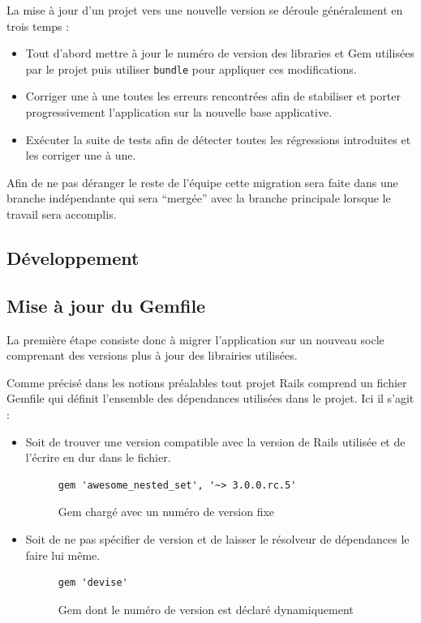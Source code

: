 \documentclass[12pt,a4paper]{book}
\begin{document}
La mise à jour d'un projet vers une nouvelle version se déroule généralement en trois temps :
\begin{itemize}
  \item Tout d'abord mettre à jour le numéro de version des libraries et Gem utilisées par le projet puis utiliser \texttt{bundle} pour appliquer ces modifications.
  \item Corriger une à une toutes les erreurs rencontrées afin de stabiliser et porter progressivement l'application sur la nouvelle base applicative.
  \item Exécuter la suite de tests afin de détecter toutes les régressions introduites et les corriger une à une.
\end{itemize}

Afin de ne pas déranger le reste de l'équipe cette migration sera faite dans une branche indépendante qui sera ``mergée'' avec la branche principale lorsque le travail sera accomplis.

\subsection{Développement}

\subsection{Mise à jour du Gemfile}

La première étape consiste donc à migrer l'application sur un nouveau socle comprenant des versions plus à jour des librairies utilisées.

Comme précisé dans les notions préalables tout projet Rails comprend un fichier Gemfile qui définit l'ensemble des dépendances utilisées dans le projet. Ici il s'agit :
\begin{itemize}
  \item Soit de trouver une version compatible avec la version de Rails utilisée et de l'écrire en dur dans le fichier.
  
    \begin{figure}[h]
    \lstset{language=ruby}
    \begin{lstlisting}
gem 'awesome_nested_set', '~> 3.0.0.rc.5'
    \end{lstlisting}
     \caption{Gem chargé avec un numéro de version fixe}
    \end{figure}
    
  \item Soit de ne pas spécifier de version et de laisser le résolveur de dépendances le faire lui même.
  
    \begin{figure}[h]
    \lstset{language=ruby}
    \begin{lstlisting}
gem 'devise'
    \end{lstlisting}
     \caption{Gem dont le numéro de version est déclaré dynamiquement}
    \end{figure}
\end{itemize}
\end{document}
